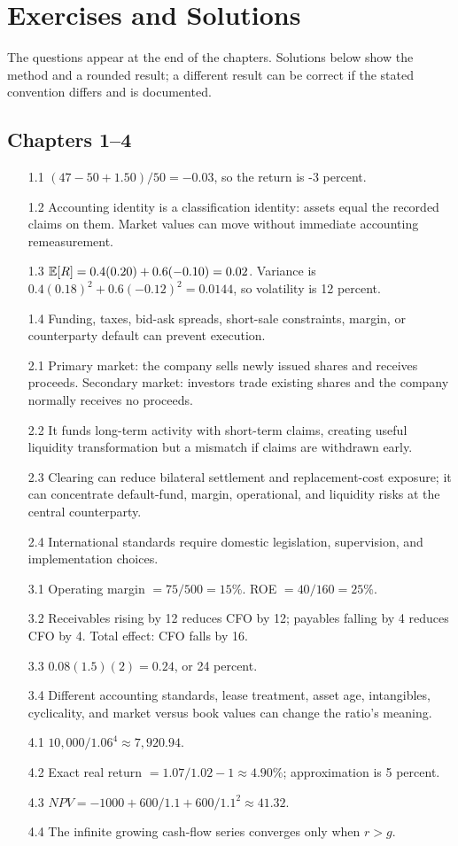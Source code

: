 \chapter{Exercises and Solutions}

The questions appear at the end of the chapters. Solutions below show the method and a rounded result; a different result can be correct if the stated convention differs and is documented.

\section*{Chapters 1--4}
\begin{enumerate}
  \item[1.1] $(47-50+1.50)/50=-0.03$, so the return is -3 percent.
  \item[1.2] Accounting identity is a classification identity: assets equal the recorded claims on them. Market values can move without immediate accounting remeasurement.
  \item[1.3] $\mathbb{E}[R]=0.4(0.20)+0.6(-0.10)=0.02$. Variance is $0.4(0.18)^2+0.6(-0.12)^2=0.0144$, so volatility is 12 percent.
  \item[1.4] Funding, taxes, bid-ask spreads, short-sale constraints, margin, or counterparty default can prevent execution.
  \item[2.1] Primary market: the company sells newly issued shares and receives proceeds. Secondary market: investors trade existing shares and the company normally receives no proceeds.
  \item[2.2] It funds long-term activity with short-term claims, creating useful liquidity transformation but a mismatch if claims are withdrawn early.
  \item[2.3] Clearing can reduce bilateral settlement and replacement-cost exposure; it can concentrate default-fund, margin, operational, and liquidity risks at the central counterparty.
  \item[2.4] International standards require domestic legislation, supervision, and implementation choices.
  \item[3.1] Operating margin $=75/500=15\%$. ROE $=40/160=25\%$.
  \item[3.2] Receivables rising by 12 reduces CFO by 12; payables falling by 4 reduces CFO by 4. Total effect: CFO falls by 16.
  \item[3.3] $0.08(1.5)(2)=0.24$, or 24 percent.
  \item[3.4] Different accounting standards, lease treatment, asset age, intangibles, cyclicality, and market versus book values can change the ratio's meaning.
  \item[4.1] $10,000/1.06^4\approx7,920.94$.
  \item[4.2] Exact real return $=1.07/1.02-1\approx4.90\%$; approximation is 5 percent.
  \item[4.3] $NPV=-1000+600/1.1+600/1.1^2\approx41.32$.
  \item[4.4] The infinite growing cash-flow series converges only when $r>g$.
\end{enumerate}

